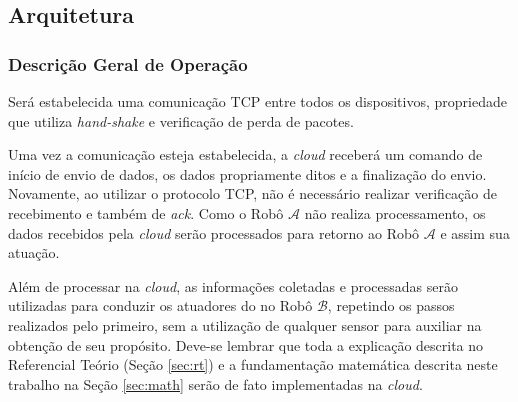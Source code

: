 \documentclass[portugues, brazil, a4paper,12pt]{article}
\begin{document}

	\subsection{Arquitetura}
		\subsubsection{Descrição Geral de Operação}

		Será estabelecida uma comunicação TCP entre todos os dispositivos, propriedade que utiliza \textit{hand-shake} e verificação de perda de pacotes.

		Uma vez a comunicação esteja estabelecida, a \textit{cloud} receberá um comando de início de envio de dados, os dados propriamente ditos e a finalização do envio. Novamente, ao utilizar o protocolo TCP, não é necessário realizar verificação de recebimento e também de \textit{ack}. Como o Robô $ \mathcal{A} $ não realiza processamento, os dados recebidos pela \textit{cloud} serão processados para retorno ao Robô $ \mathcal{A} $ e assim sua atuação.

		Além de processar na \textit{cloud}, as informações coletadas e processadas serão utilizadas para conduzir os atuadores do no Robô $ \mathcal{B} $, repetindo os passos realizados pelo primeiro, sem a utilização de qualquer sensor para auxiliar na obtenção de seu propósito. Deve-se lembrar que toda a explicação descrita no Referencial Teório (Seção \ref{sec:rt}) e a fundamentação matemática descrita neste trabalho na Seção \ref{sec:math} serão de fato implementadas na \textit{cloud}.
\end{document}
